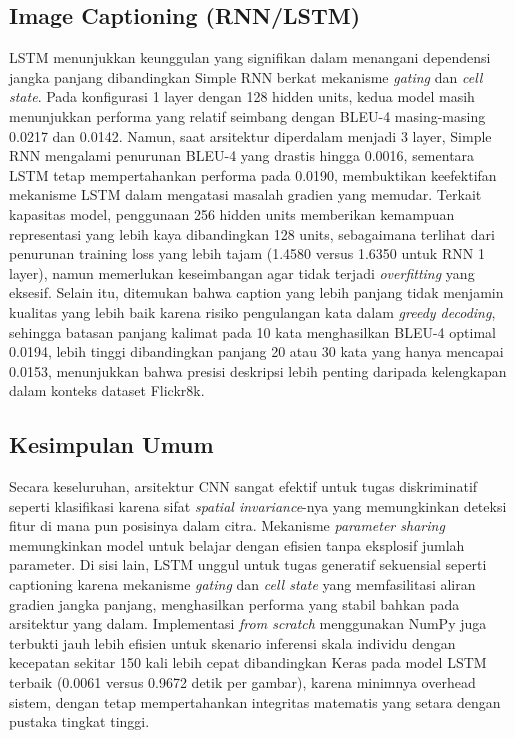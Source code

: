 \subsection{Image Captioning (RNN/LSTM)}

LSTM menunjukkan keunggulan yang signifikan dalam menangani dependensi jangka panjang dibandingkan Simple RNN berkat mekanisme \textit{gating} dan \textit{cell state}. Pada konfigurasi 1 layer dengan 128 hidden units, kedua model masih menunjukkan performa yang relatif seimbang dengan BLEU-4 masing-masing 0.0217 dan 0.0142. Namun, saat arsitektur diperdalam menjadi 3 layer, Simple RNN mengalami penurunan BLEU-4 yang drastis hingga 0.0016, sementara LSTM tetap mempertahankan performa pada 0.0190, membuktikan keefektifan mekanisme LSTM dalam mengatasi masalah gradien yang memudar. Terkait kapasitas model, penggunaan 256 hidden units memberikan kemampuan representasi yang lebih kaya dibandingkan 128 units, sebagaimana terlihat dari penurunan training loss yang lebih tajam (1.4580 versus 1.6350 untuk RNN 1 layer), namun memerlukan keseimbangan agar tidak terjadi \textit{overfitting} yang eksesif. Selain itu, ditemukan bahwa caption yang lebih panjang tidak menjamin kualitas yang lebih baik karena risiko pengulangan kata dalam \textit{greedy decoding}, sehingga batasan panjang kalimat pada 10 kata menghasilkan BLEU-4 optimal 0.0194, lebih tinggi dibandingkan panjang 20 atau 30 kata yang hanya mencapai 0.0153, menunjukkan bahwa presisi deskripsi lebih penting daripada kelengkapan dalam konteks dataset Flickr8k.

\subsection{Kesimpulan Umum}

Secara keseluruhan, arsitektur CNN sangat efektif untuk tugas diskriminatif seperti klasifikasi karena sifat \textit{spatial invariance}-nya yang memungkinkan deteksi fitur di mana pun posisinya dalam citra. Mekanisme \textit{parameter sharing} memungkinkan model untuk belajar dengan efisien tanpa eksplosif jumlah parameter. Di sisi lain, LSTM unggul untuk tugas generatif sekuensial seperti captioning karena mekanisme \textit{gating} dan \textit{cell state} yang memfasilitasi aliran gradien jangka panjang, menghasilkan performa yang stabil bahkan pada arsitektur yang dalam. Implementasi \textit{from scratch} menggunakan NumPy juga terbukti jauh lebih efisien untuk skenario inferensi skala individu dengan kecepatan sekitar 150 kali lebih cepat dibandingkan Keras pada model LSTM terbaik (0.0061 versus 0.9672 detik per gambar), karena minimnya overhead sistem, dengan tetap mempertahankan integritas matematis yang setara dengan pustaka tingkat tinggi.
